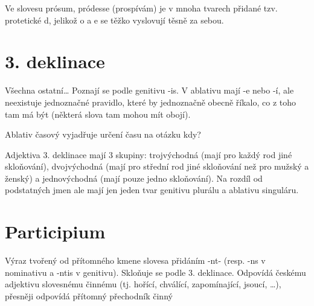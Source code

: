 \documentclass[12pt]{article}					%
\begin{document}
    Ve slovesu prósum, pródesse (prospívám) je v mnoha tvarech přidané tzv. protetické d, jelikož o a e se těžko vyslovují těsně za sebou.

\section{3. deklinace}
    Všechna ostatní… Poznají se podle genitivu -is. V ablativu mají -e nebo -í, ale neexistuje jednoznačné pravidlo, které by jednoznačně obecně říkalo, co z toho tam má být (některá slova tam mohou mít obojí).


    Ablativ časový vyjadřuje určení času na otázku kdy?

    Adjektiva 3. deklinace mají 3 skupiny: trojvýchodná (mají pro každý rod jiné skloňování), dvojvýchodná (mají pro střední rod jiné skloňování než pro mužský a ženský) a jednovýchodná (mají pouze jedno skloňování). Na rozdíl od podstatných jmen ale mají jen jeden tvar genitivu plurálu a ablativu singuláru.


\section{Participium}
    Výraz tvořený od přítomného kmene slovesa přidáním -nt- (resp. -ns v nominativu a -ntis v genitivu). Skloňuje se podle 3. deklinace. Odpovídá českému adjektivu slovesnému činnému (tj. hořící, chválící, zapomínající, jsoucí, …), přesněji odpovídá přítomný přechodník činný

\newpage
\end{document}
